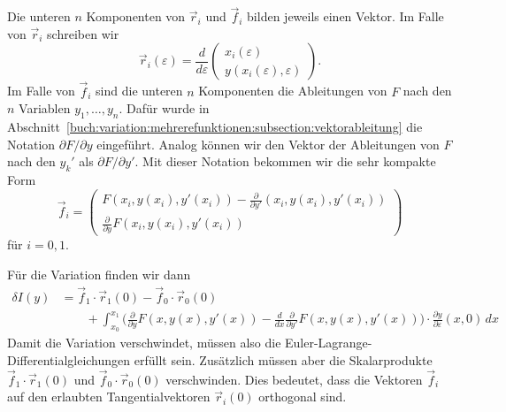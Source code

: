 Die unteren $n$ Komponenten von $\vec{r}_i$ und $\vec{f}_i$ bilden jeweils
einen Vektor.
Im Falle von $\vec{r}_i$ schreiben wir
\[
\vec{r}_i(\varepsilon)
=
\frac{d}{d\varepsilon}
\begin{pmatrix}
x_i(\varepsilon)\\
y(x_i(\varepsilon),\varepsilon)
\end{pmatrix}.
\]
Im Falle von $\vec{f}_i$ sind die unteren $n$ Komponenten
die Ableitungen von $F$ nach den $n$ Variablen $y_1,\dots,y_n$.
Dafür wurde in
Abschnitt~\ref{buch:variation:mehrerefunktionen:subsection:vektorableitung}
die Notation $\partial F/\partial y$ eingeführt.
Analog können wir den Vektor der Ableitungen von $F$ nach den
$y_k'$ als $\partial F/\partial y'$.
Mit dieser Notation bekommen wir die sehr kompakte Form
\[
\vec{f}_i
=
\begin{pmatrix}
\displaystyle
F(x_i,y(x_i),y'(x_i)) - \frac{\partial}{\partial y'}(x_i,y(x_i),y'(x_i))
\\[5pt]
\displaystyle
\frac{\partial}{\partial y} F(x_i,y(x_i),y'(x_i))
\end{pmatrix}
\]
für $i=0,1$.

Für die Variation finden wir dann
\begin{align*}
\delta I(y)
&=
\vec{f}_1\cdot \vec{r}_1(0)
-
\vec{f}_0\cdot \vec{r}_0(0)
\\
&\qquad
+
\int_{x_0}^{x_1}
\biggl(
\frac{\partial}{\partial y}F(x,y(x),y'(x))
-
\frac{d}{dx}
\frac{\partial}{\partial y'}F(x,y(x),y'(x))
\biggr)
\cdot
\frac{\partial y}{\partial\varepsilon}(x,0)
\,dx
\end{align*}
Damit die Variation verschwindet, müssen also die
Euler-Lagrange-Differential\-glei\-chun\-gen erfüllt sein.
Zusätzlich müssen aber die Skalarprodukte
$\vec{f}_1\cdot \vec{r}_1(0)$
und
$\vec{f}_0\cdot \vec{r}_0(0)$
verschwinden.
Dies bedeutet, dass die Vektoren $\vec{f}_i$ auf den erlaubten
Tangentialvektoren $\vec{r}_i(0)$ orthogonal sind.





